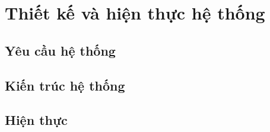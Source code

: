 \chapter{Thiết kế và hiện thực hệ thống}
\label{chap:implementation}

\section{Yêu cầu hệ thống}

\section{Kiến trúc hệ thống}

\section{Hiện thực}
